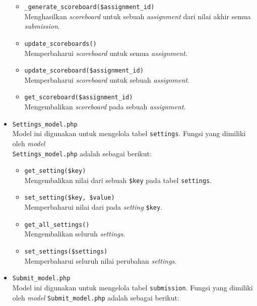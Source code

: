 \begin{itemize}
	      \begin{itemize}
		      \item \verb|_generate_scoreboard($assignment_id)| \\
		            Menghasilkan \textit{scoreboard} untuk sebuah \textit{assignment} dari nilai akhir semua \textit{submission}.
		      \item \verb|update_scoreboards()| \\
		            Memperbaharui \textit{scoreboard} untuk semua \textit{assignment}.
		      \item \verb|update_scoreboard($assignment_id)| \\
		            Memperbaharui \textit{scoreboard} untuk sebuah \textit{assignment}.
		      \item \verb|get_scoreboard($assignment_id)| \\
		            Mengembalikan \textit{scoreboard} pada sebuah \textit{assignment}.
	      \end{itemize}

	\item \verb|Settings_model.php| \\
	      Model ini digunakan untuk mengelola tabel \verb|settings|. Fungsi yang dimiliki oleh \textit{model} \\\verb|Settings_model.php| adalah sebagai berikut:

	      \begin{itemize}
		      \item \verb|get_setting($key)| \\
		            Mengembalikan nilai dari sebuah \verb|$key| pada tabel \verb|settings|.
		      \item \verb|set_setting($key, $value)| \\
		            Memperbaharui nilai dari pada \textit{setting} \verb|$key|.
		      \item \verb|get_all_settings()| \\
		            Mengembalikan seluruh \textit{settings}.
		      \item \verb|set_settings($settings)| \\
		            Memperbaharui seluruh nilai perubahan \textit{settings}.
	      \end{itemize}

	\item \verb|Submit_model.php| \\
	      Model ini digunakan untuk mengelola tabel \verb|submission|. Fungsi yang dimiliki oleh \textit{model} \verb|Submit_model.php| adalah sebagai berikut:


\end{itemize}
